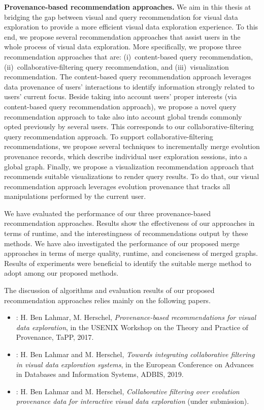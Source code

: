  \bigskip 
 \noindent \textbf{Provenance-based recommendation approaches.} We aim in this thesis at bridging the gap between visual and query recommendation for visual data exploration to provide a more efficient visual data exploration experience.
To this end, we propose several recommendation approaches that assist users in the whole process of visual data exploration. More specifically, we propose three recommendation approaches that are: (i)~content-based query recommendation, (ii)~collaborative-filtering query recommendation, and (iii)~visualization recommendation. The content-based query recommendation approach leverages data provenance of users' interactions to identify information strongly related to users' current focus. Beside taking into account users' proper interests (via content-based query recommendation approach), we propose a novel query recommendation approach to take also into account global trends commonly opted previously by several users. This corresponds to our collaborative-filtering query recommendation approach.
 To support collaborative-filtering recommendations, we propose several techniques to incrementally merge evolution provenance records, which describe individual user exploration sessions, into a global graph. 
Finally, we propose a visualization recommendation approach that recommends suitable visualizations to render query results. To do that, our visual recommendation approach leverages evolution provenance that tracks all manipulations performed by the current user.



  We have evaluated the performance of our three provenance-based recommendation approaches. 
Results show the effectiveness of our approaches in terms of runtime, and the interestingness of recommendations output by these methods.
We have also investigated the performance of our proposed merge approaches in terms of merge quality, runtime, and conciseness of merged graphs. Results of experiments were beneficial to identify the suitable merge method to adopt among our proposed methods. 


The discussion of algorithms and evaluation results of our proposed recommendation approaches relies mainly on the following papers.
\begin{itemize}
\item \cite{Houssem:17:tapp}: H. Ben Lahmar, M. Herschel, \emph{Provenance-based recommendations for visual data exploration}, in the USENIX Workshop on the Theory and Practice of Provenance, TaPP, 2017.
\item \cite{Houssem:19:adbis}: H. Ben Lahmar and M. Herschel, \emph{Towards integrating collaborative filtering in visual data exploration systems}, in the European Conference on Advances in Databases and Information Systems, ADBIS, 2019.
\item \cite{Houssem:19:IS}: H. Ben Lahmar and M. Herschel, \emph{Collaborative filtering over evolution provenance data for interactive visual data exploration} (under submission).
\end{itemize}



